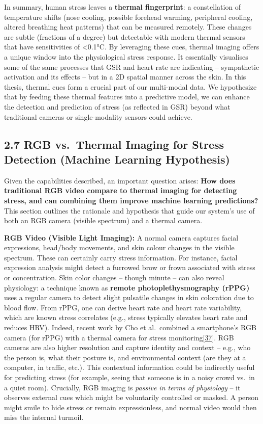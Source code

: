 \documentclass[12pt,a4paper]{article}
\begin{document}
In summary, human stress leaves a \textbf{thermal fingerprint}: a constellation of temperature shifts (nose cooling, possible forehead warming, peripheral cooling, altered breathing heat patterns) that can be measured remotely. These changes are subtle (fractions of a degree) but detectable with modern thermal sensors that have sensitivities of \textless0.1°C. By leveraging these cues, thermal imaging offers a unique window into the physiological stress response. It essentially visualises some of the same processes that GSR and heart rate are indicating -- sympathetic activation and its effects -- but in a 2D spatial manner across the skin. In this thesis, thermal cues form a crucial part of our multi-modal data. We hypothesize that by feeding these thermal features into a predictive model, we can enhance the detection and prediction of stress (as reflected in GSR) beyond what traditional cameras or single-modality sensors could achieve.

\subsection{2.7 RGB vs.~Thermal Imaging for Stress Detection (Machine Learning Hypothesis)}\label{rgb-vs.-thermal-imaging-for-stress-detection-machine-learning-hypothesis}

Given the capabilities described, an important question arises: \textbf{How does traditional RGB video compare to thermal imaging for detecting stress, and can combining them improve machine learning predictions?} This section outlines the rationale and hypothesis that guide our system's use of both an RGB camera (visible spectrum) and a thermal camera.

\textbf{RGB Video (Visible Light Imaging):} A normal camera captures facial expressions, head/body movements, and skin colour changes in the visible spectrum. These can certainly carry stress information. For instance, facial expression analysis might detect a furrowed brow or frown associated with stress or concentration. Skin color changes -- though minute -- can also reveal physiology: a technique known as \textbf{remote photoplethysmography (rPPG)} uses a regular camera to detect slight pulsatile changes in skin coloration due to blood flow. From rPPG, one can derive heart rate and heart rate variability, which are known stress correlates (e.g., stress typically elevates heart rate and reduces HRV). Indeed, recent work by Cho et al.~combined a smartphone's RGB camera (for rPPG) with a thermal camera for stress monitoring\href{https://www.mdpi.com/2076-3417/10/8/2924\#:~:text=proposed\%20a\%20system\%20consisting\%20of,study\%20by\%20the\%20same\%20authors}{{[}37{]}}. RGB cameras are also higher resolution and capture identity and context -- e.g., who the person is, what their posture is, and environmental context (are they at a computer, in traffic, etc.). This contextual information could be indirectly useful for predicting stress (for example, seeing that someone is in a noisy crowd vs.~in a quiet room). Crucially, RGB imaging is \emph{passive in terms of physiology} -- it observes external cues which might be voluntarily controlled or masked. A person might smile to hide stress or remain expressionless, and normal video would then miss the internal turmoil.
\end{document}
